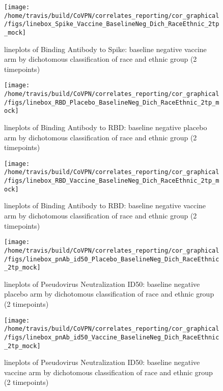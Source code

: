 \documentclass[]{book}
\theoremstyle{definition}
\theoremstyle{definition}
\theoremstyle{definition}
\newcommand{\1}{\mathbbm{1}}
\begin{document}
\clearpage
\begin{figure}[H]

{\centering \texttt{[image: /home/travis/build/CoVPN/correlates\_reporting/cor\_graphical/figs/linebox\_Spike\_Vaccine\_BaselineNeg\_Dich\_RaceEthnic\_2tp\_mock]} 

}

\caption{lineplots of Binding Antibody to Spike: baseline negative vaccine arm by dichotomous classification of race and ethnic group (2 timepoints)}\label{fig:unnamed-chunk-220}
\end{figure}

\clearpage
\begin{figure}[H]

{\centering \texttt{[image: /home/travis/build/CoVPN/correlates\_reporting/cor\_graphical/figs/linebox\_RBD\_Placebo\_BaselineNeg\_Dich\_RaceEthnic\_2tp\_mock]} 

}

\caption{lineplots of Binding Antibody to RBD: baseline negative placebo arm by dichotomous classification of race and ethnic group (2 timepoints)}\label{fig:unnamed-chunk-221}
\end{figure}

\clearpage
\begin{figure}[H]

{\centering \texttt{[image: /home/travis/build/CoVPN/correlates\_reporting/cor\_graphical/figs/linebox\_RBD\_Vaccine\_BaselineNeg\_Dich\_RaceEthnic\_2tp\_mock]} 

}

\caption{lineplots of Binding Antibody to RBD: baseline negative vaccine arm by dichotomous classification of race and ethnic group (2 timepoints)}\label{fig:unnamed-chunk-222}
\end{figure}

\clearpage
\begin{figure}[H]

{\centering \texttt{[image: /home/travis/build/CoVPN/correlates\_reporting/cor\_graphical/figs/linebox\_pnAb\_id50\_Placebo\_BaselineNeg\_Dich\_RaceEthnic\_2tp\_mock]} 

}

\caption{lineplots of Pseudovirus Neutralization ID50: baseline negative placebo arm by dichotomous classification of race and ethnic group (2 timepoints)}\label{fig:unnamed-chunk-223}
\end{figure}

\clearpage
\begin{figure}[H]

{\centering \texttt{[image: /home/travis/build/CoVPN/correlates\_reporting/cor\_graphical/figs/linebox\_pnAb\_id50\_Vaccine\_BaselineNeg\_Dich\_RaceEthnic\_2tp\_mock]} 

}

\caption{lineplots of Pseudovirus Neutralization ID50: baseline negative vaccine arm by dichotomous classification of race and ethnic group (2 timepoints)}\label{fig:unnamed-chunk-224}
\end{figure}
\end{document}
